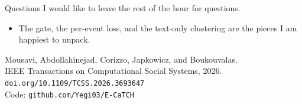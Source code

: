 \begin{frame}{Questions}
  \vspace{0.4em}
  {\Large I would like to leave the rest of the hour for questions.}
  \vspace{1.1em}
  \begin{itemize}
    \item The gate, the per-event loss, and the text-only clustering are the pieces I am happiest to unpack.
  \end{itemize}
  \vspace{1.2em}
  {\small
    Mousavi, Abdollahinejad, Corizzo, Japkowicz, and Boukouvalas.\\
    IEEE Transactions on Computational Social Systems, 2026.\\
    \texttt{doi.org/10.1109/TCSS.2026.3693647}\\[0.35em]
    Code: \texttt{github.com/Yegi03/E-CaTCH}}
\end{frame}


